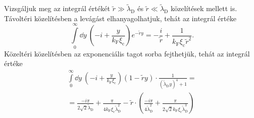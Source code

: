 \documentclass[a4paper,12pt,titlepage]{article}
\newcommand{\kF}{{k_\text{F}}}
\begin{document}
Vizsgáljuk meg az integrál értékét $\tilde{r} \gg \tilde{\lambda}_\text{D}$ és $\tilde{r} \ll \tilde{\lambda}_\text{D}$ közelítések mellett is.  Távoltéri közelítésben a levágást elhanyagolhatjuk, tehát az integrál értéke
\begin{equation} \label{g-n-far-field}
	\int\limits_0^\infty \dd{y} ~ \left( -i + \frac{y}{\kF \xi_\text{c}} \right) e^{-\tilde{r} y} = -\frac{i}{\tilde{r}} + \frac{1}{\kF \xi_\text{c} \tilde{r}^2}.
\end{equation}
Közeltéri közelítésben az exponenciális tagot sorba fejthetjük, tehát az integrál értéke
\begin{multline} \label{g-n-near-field}
	\int\limits_0^\infty \dd{y} ~ \left( -i + \frac{y}{\kF \xi_\text{c}} \right) \left( 1 - \tilde{r} y \right) \cdot \frac{1}{\left( \tilde{\lambda}_\text{D} y \right)^4 + 1} = \\
	= \frac{-i \pi}{2 \sqrt{2} \tilde{\lambda}_\text{D}} + \frac{\pi}{4 \kF \xi_\text{c} \tilde{\lambda}_\text{D}^2} - \tilde{r} \cdot \left( \frac{-i \pi}{4 \tilde{\lambda}_\text{D}^2} + \frac{\pi}{2 \sqrt{2} \kF \xi_\text{c} \tilde{\lambda}_\text{D}^3} \right)
\end{multline}
\end{document}
